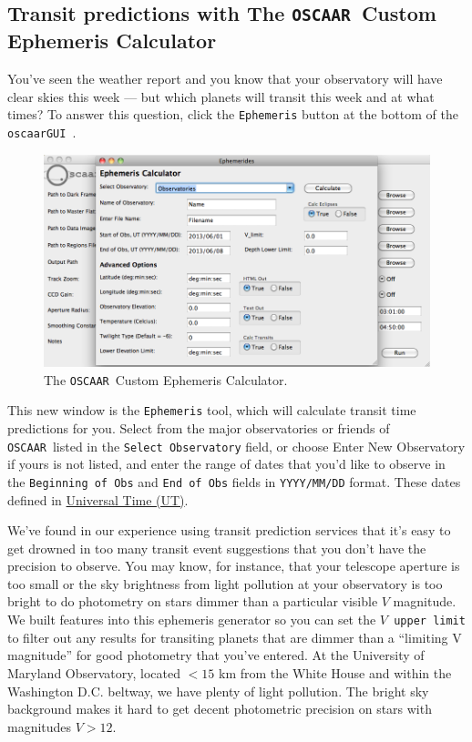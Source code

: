 \documentclass[a4paper]{article}
\newcommand{\code}[1]{\texttt{#1}}
\newcommand{\oscaar}{\code{OSCAAR}~}
\newcommand{\gui}{\code{oscaarGUI}~}
\begin{document}
\subsection{Transit predictions with The \oscaar Custom Ephemeris Calculator}
You've seen the weather report and you know that your observatory will have clear skies this week --- but which planets will transit this week and at what times? To answer this question, click the \code{Ephemeris} button at the bottom of the \gui.
\begin{figure}[H]
\begin{center}
\includegraphics[scale=0.35]{imgs/ephemeris.png}
\caption{The \oscaar Custom Ephemeris Calculator.}
\label{fig:ephgui}
\end{center}	
\end{figure}
This new window is the \code{Ephemeris} tool, which will calculate transit time predictions for you. Select from the major observatories or friends of \oscaar listed in the \code{Select Observatory} field, or choose Enter New Observatory if yours is not listed, and enter the range of dates that you'd like to observe in the \code{Beginning of Obs} and \code{End of Obs} fields in \code{YYYY/MM/DD} format.  These dates defined in \href{http://en.wikipedia.org/wiki/Universal_time}{Universal Time (UT)}.

We've found in our experience using transit prediction services that it's easy to get drowned in too many transit event suggestions that you don't have the precision to observe. You may know, for instance, that your telescope aperture is too small or the sky brightness from light pollution at your observatory is too bright to do photometry on stars dimmer than a particular visible $V$ magnitude. We built features into this ephemeris generator so you can set the \code{$V$ upper limit} to filter out any results for transiting planets that are dimmer than a ``limiting V magnitude'' for good photometry that you've entered. At the University of Maryland Observatory, located $<15$ km from the White House and within the Washington D.C. beltway, we have plenty of light pollution. The bright sky background makes it hard to get decent photometric precision on stars with magnitudes $V>12$.
\end{document}
